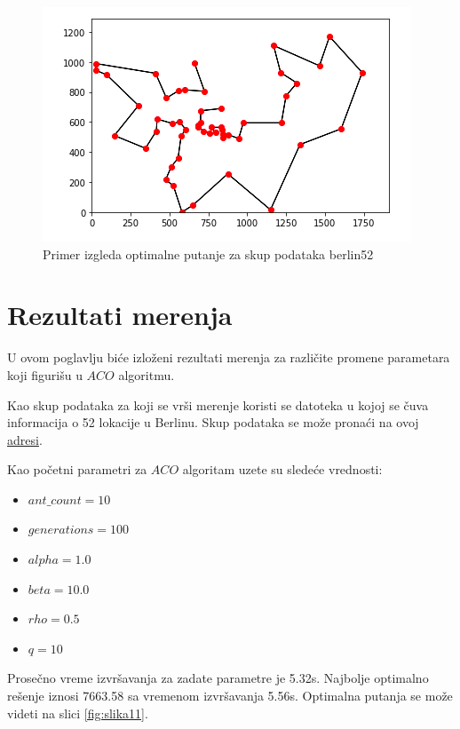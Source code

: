 \documentclass[a4paper]{article}
\begin{document}
\begin{figure}[h!]
\begin{center}
\includegraphics[scale=0.7]{slika10.png}
\end{center}
\caption{Primer izgleda optimalne putanje za skup podataka berlin52}
\label{fig:slika10}
\end{figure}

\clearpage
\section{Rezultati merenja}
\label{sec:rezultati}

U ovom poglavlju biće izloženi rezultati merenja za različite promene parametara koji figurišu u $ACO$ algoritmu.

Kao skup podataka za koji se vrši merenje koristi se datoteka u kojoj se čuva informacija o 52 lokacije u Berlinu. Skup podataka se može pronaći na ovoj \href{http://elib.zib.de/pub/mp-testdata/tsp/tsplib/tsp/berlin52.tsp}{adresi}. 


Kao početni parametri za $ACO$ algoritam uzete su sledeće vrednosti:

\begin{itemize}
\item $ant\_count = 10$
\item $generations = 100$
\item $alpha = 1.0$
\item $beta = 10.0$
\item $rho = 0.5$
\item $q = 10$

\end{itemize}

Prosečno vreme izvršavanja za zadate parametre je 5.32s. Najbolje optimalno rešenje iznosi 7663.58 sa vremenom izvršavanja 5.56s. Optimalna putanja se može videti na slici \ref{fig:slika11}.
\end{document}
